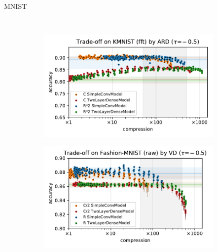 \documentclass{beamer}
\begin{document}
\begin{frame}[c]{MNIST}{\insertsection}
\begin{figure}[t]
\begin{subfigure}[b]{0.5\columnwidth}
    \end{subfigure} \\ %
    \begin{subfigure}[b]{0.5\columnwidth}
      \centering
      \includegraphics[width=\linewidth]{figure__mnist-like__trade-off/appendix__cmp__ARD__kmnist__fft__-0.5.pdf}
    \end{subfigure}\hspace{-1em}%
    \begin{subfigure}[b]{0.5\columnwidth}
      \centering
      \includegraphics[width=\linewidth]{figure__mnist-like__trade-off/appendix__cmp__VD__fashionmnist__raw__-0.5.pdf}
    \end{subfigure}%
  \end{figure}
\end{frame}
\end{document}
